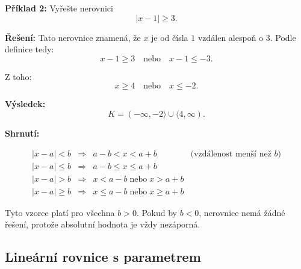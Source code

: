 \documentclass[12pt,a4paper]{article}
\begin{document}
\begin{examplebox}
\textbf{Příklad 2:}  
Vyřešte nerovnici
\[
|x - 1| \ge 3.
\]

\textbf{Řešení:}  
Tato nerovnice znamená, že \(x\) je od čísla \(1\) vzdálen alespoň o \(3\).  
Podle definice tedy:
\[
x - 1 \ge 3 \quad \text{nebo} \quad x - 1 \le -3.
\]

Z toho:
\[
x \ge 4 \quad \text{nebo} \quad x \le -2.
\]

\textbf{Výsledek:}
\[
K = (-\infty, -2\rangle \cup \langle 4, \infty).
\]

\begin{center}
\end{center}
\end{examplebox}

\newpage
\begin{notebox}
\textbf{Shrnutí:}

\[
\begin{array}{rcll}
|x - a| < b & \Rightarrow & a - b < x < a + b & \text{(vzdálenost menší než $b$)}\\[4pt]
|x - a| \le b & \Rightarrow & a - b \le x \le a + b &\\[4pt]
|x - a| > b & \Rightarrow & x < a - b \;\text{nebo}\; x > a + b &\\[4pt]
|x - a| \ge b & \Rightarrow & x \le a - b \;\text{nebo}\; x \ge a + b &
\end{array}
\]


\medskip
\noindent
Tyto vzorce platí pro všechna \(b > 0\).  
Pokud by \(b < 0\), nerovnice nemá žádné řešení, protože absolutní hodnota je vždy nezáporná.
\end{notebox}



\newpage
\subsection{Lineární rovnice s parametrem}
\end{document}
